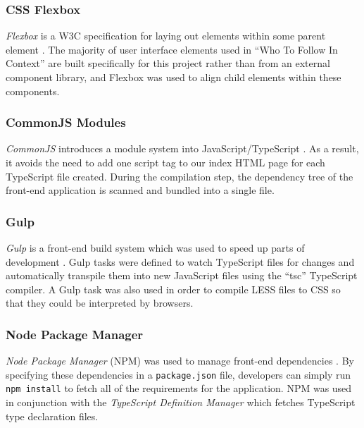 \documentclass{l4proj}
\newcommand{\code}[1]{\texttt{#1}}
\begin{document}
        \subsubsection{CSS Flexbox}
        \textit{Flexbox} is a W3C specification for laying out elements within some parent element \cite{flexbox}. The majority of user interface elements used in ``Who To Follow In Context'' are built specifically for this project rather than from an external component library, and Flexbox was used to align child elements within these components.

        \subsubsection{CommonJS Modules}
        \textit{CommonJS} introduces a module system into JavaScript/TypeScript \cite{commonjs}. As a result, it avoids the need to add one script tag to our index HTML page for each TypeScript file created. During the compilation step, the dependency tree of the front-end application is scanned and bundled into a single file.

        \subsubsection{Gulp}
        \textit{Gulp} is a front-end build system which was used to speed up parts of development \cite{gulp}. Gulp tasks were defined to watch TypeScript files for changes and automatically transpile them into new JavaScript files using the ``tsc'' TypeScript compiler. A Gulp task was also used in order to compile LESS files to CSS so that they could be interpreted by browsers.
        
        \subsubsection{Node Package Manager}
        \textit{Node Package Manager} (NPM) was used to manage front-end dependencies \cite{npm}. By specifying these dependencies in a \code{package.json} file, developers can simply run \code{npm install} to fetch all of the requirements for the application. NPM was used in conjunction with the \textit{TypeScript Definition Manager} which fetches TypeScript type declaration files.
        
\end{document}
